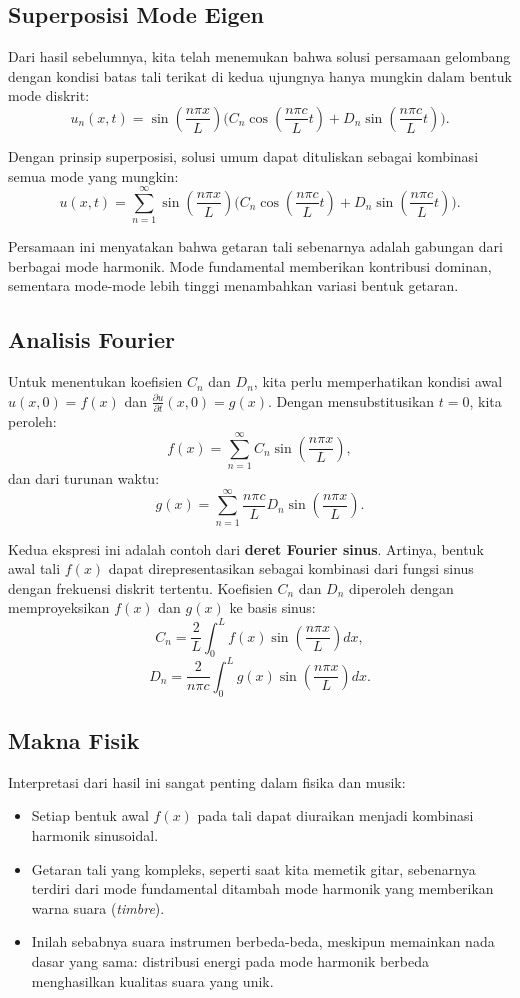 \documentclass{bukumjh}
\begin{document}
\subsection*{Superposisi Mode Eigen}
Dari hasil sebelumnya, kita telah menemukan bahwa solusi persamaan gelombang dengan kondisi batas tali terikat di kedua ujungnya hanya mungkin dalam bentuk mode diskrit:
\[
u_n(x,t) = \sin\left(\frac{n\pi x}{L}\right) \Big( C_n \cos\left(\frac{n\pi c}{L} t\right) + D_n \sin\left(\frac{n\pi c}{L} t\right) \Big).
\]

Dengan prinsip superposisi, solusi umum dapat dituliskan sebagai kombinasi semua mode yang mungkin:
\[
u(x,t) = \sum_{n=1}^{\infty} \sin\left(\frac{n\pi x}{L}\right) 
\Big( C_n \cos\left(\frac{n\pi c}{L} t\right) + D_n \sin\left(\frac{n\pi c}{L} t\right) \Big).
\]

Persamaan ini menyatakan bahwa getaran tali sebenarnya adalah gabungan dari berbagai mode harmonik. 
Mode fundamental memberikan kontribusi dominan, sementara mode-mode lebih tinggi menambahkan variasi bentuk getaran.

\subsection*{Analisis Fourier}
Untuk menentukan koefisien $C_n$ dan $D_n$, kita perlu memperhatikan kondisi awal $u(x,0) = f(x)$ dan $\frac{\partial u}{\partial t}(x,0) = g(x)$. 
Dengan mensubstitusikan $t=0$, kita peroleh:
\[
f(x) = \sum_{n=1}^{\infty} C_n \sin\left(\frac{n\pi x}{L}\right),
\]
dan dari turunan waktu:
\[
g(x) = \sum_{n=1}^{\infty} \frac{n\pi c}{L} D_n \sin\left(\frac{n\pi x}{L}\right).
\]

Kedua ekspresi ini adalah contoh dari \textbf{deret Fourier sinus}. 
Artinya, bentuk awal tali $f(x)$ dapat direpresentasikan sebagai kombinasi dari fungsi sinus dengan frekuensi diskrit tertentu. 
Koefisien $C_n$ dan $D_n$ diperoleh dengan memproyeksikan $f(x)$ dan $g(x)$ ke basis sinus:
\[
C_n = \frac{2}{L} \int_0^L f(x) \sin\left(\frac{n\pi x}{L}\right) dx,
\]
\[
D_n = \frac{2}{n\pi c} \int_0^L g(x) \sin\left(\frac{n\pi x}{L}\right) dx.
\]

\subsection*{Makna Fisik}
Interpretasi dari hasil ini sangat penting dalam fisika dan musik:
\begin{itemize}
  \item Setiap bentuk awal $f(x)$ pada tali dapat diuraikan menjadi kombinasi harmonik sinusoidal.
  \item Getaran tali yang kompleks, seperti saat kita memetik gitar, sebenarnya terdiri dari mode fundamental ditambah mode harmonik yang memberikan warna suara (\emph{timbre}).
  \item Inilah sebabnya suara instrumen berbeda-beda, meskipun memainkan nada dasar yang sama: distribusi energi pada mode harmonik berbeda menghasilkan kualitas suara yang unik.
\end{itemize}
\end{document}
